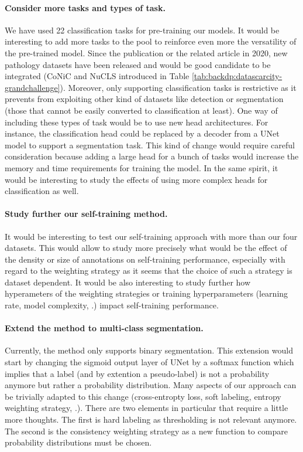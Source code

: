 \paragraph{Consider more tasks and types of task.} We have used 22 classification tasks for pre-training our models. It would be interesting to add more tasks to the pool to reinforce even more the versatility of the pre-trained model. Since the publication or the related article in 2020, new pathology datasets have been released and would be good candidate to be integrated (\eg CoNiC and NuCLS introduced in Table \ref{tab:backdp:datascarcity-grandchallenge}).  Moreover, only supporting classification tasks is restrictive as it prevents from exploiting other kind of datasets like detection or segmentation (those that cannot be easily converted to classification at least). One way of including these types of task would be to use new head architectures. For instance, the classification head could be replaced by a decoder from a UNet model to support a segmentation task. This kind of change would require careful consideration because adding a large head for a bunch of tasks would increase the memory and time requirements for training the model. In the same spirit, it would be interesting to study the effects of using more complex heads for classification as well.  

\paragraph{Study further our self-training method.} It would be interesting to test our self-training approach with more than our four datasets. This would allow to study more precisely what would be the effect of the density or size of annotations on self-training performance, especially with regard to the weighting strategy as it seems that the choice of such a strategy is dataset dependent. It would be also interesting to study further how hyperameters of the weighting strategies or training hyperparameters (\eg learning rate, model complexity, \etc.) impact self-training performance.

\paragraph{Extend the method to multi-class segmentation.} Currently, the method only supports binary segmentation. This extension would start by changing the sigmoid output layer of UNet by a softmax function which implies that a label (and by extention a pseudo-label) is not a probability anymore but rather a probability distribution. Many aspects of our approach can be trivially adapted to this change (cross-entropty loss, soft labeling, entropy weighting strategy, \etc.). There are two elements in particular that require a little more thoughts. The first is hard labeling as thresholding is not relevant anymore. The second is the consistency weighting strategy as a new function to compare probability distributions must be chosen.      

